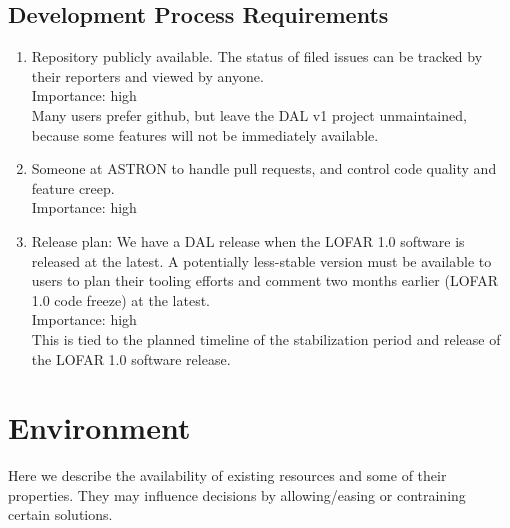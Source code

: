 \documentclass[a4paper,11pt]{article}
\begin{document}
\subsection{Development Process Requirements} \label{sec:dev_process_reqs}
\begin{enumerate}[resume, label=\it R.\arabic{*}]
\itemsep0em

\item \label{req:repos} Repository publicly available. 
The status of filed issues can be tracked by their reporters and viewed by anyone.\\
Importance: high\\
Many users prefer github, but leave the DAL v1 project unmaintained, because some features will not be immediately available.\\

\item \label{req:maintainer} Someone at ASTRON to handle pull requests, and control code quality and feature creep.\\
Importance: high\\

\item \label{req:release} Release plan: We have a DAL release when the LOFAR 1.0 software is released at the latest. A potentially less-stable version must be available to users to plan their tooling efforts and comment two months earlier (LOFAR 1.0 code freeze) at the latest.\\
Importance: high\\
This is tied to the planned timeline of the stabilization period and release of the LOFAR 1.0 software release.

\end{enumerate}



\section{Environment} \label{sec:env}

Here we describe the availability of existing resources and some of their properties.
They may influence decisions by allowing/easing or contraining certain solutions.
\end{document}

